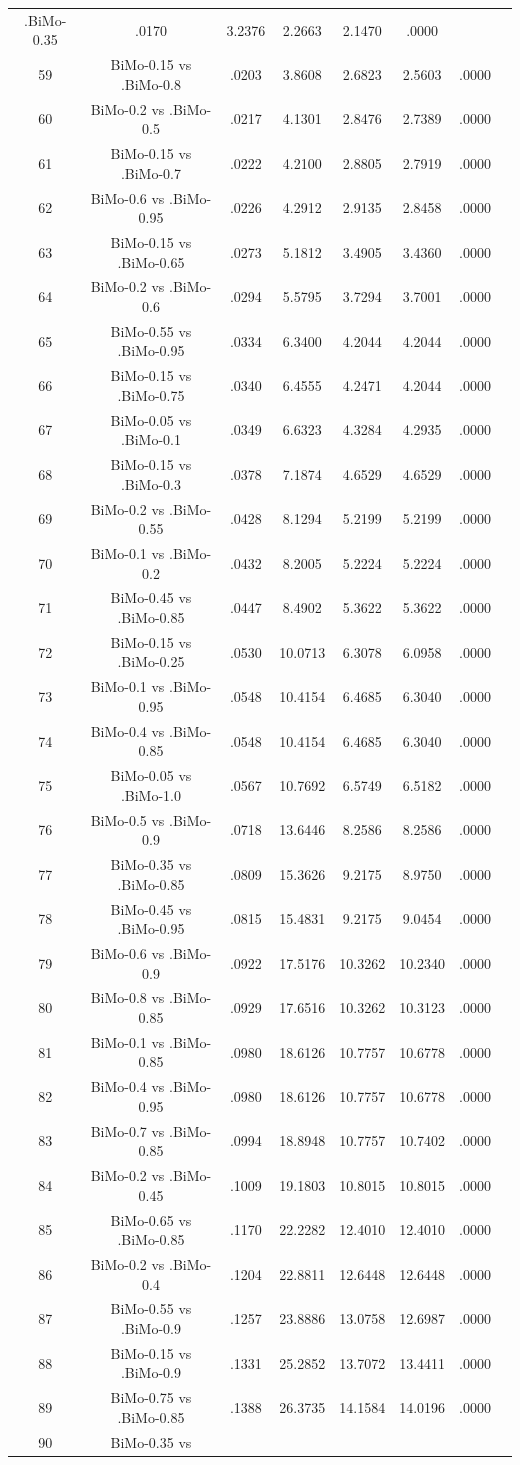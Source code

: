 \documentclass[a4paper,10pt]{article}
\begin{document}
\begin{landscape}
\begin{table}[!htp]
\begin{tabular}{cccccccc}
.BiMo-0.35&.0170&3.2376&2.2663&2.1470&.0000\\59&BiMo-0.15 vs .BiMo-0.8&.0203&3.8608&2.6823&2.5603&.0000\\60&BiMo-0.2 vs .BiMo-0.5&.0217&4.1301&2.8476&2.7389&.0000\\61&BiMo-0.15 vs .BiMo-0.7&.0222&4.2100&2.8805&2.7919&.0000\\62&BiMo-0.6 vs .BiMo-0.95&.0226&4.2912&2.9135&2.8458&.0000\\63&BiMo-0.15 vs .BiMo-0.65&.0273&5.1812&3.4905&3.4360&.0000\\64&BiMo-0.2 vs .BiMo-0.6&.0294&5.5795&3.7294&3.7001&.0000\\65&BiMo-0.55 vs .BiMo-0.95&.0334&6.3400&4.2044&4.2044&.0000\\66&BiMo-0.15 vs .BiMo-0.75&.0340&6.4555&4.2471&4.2044&.0000\\67&BiMo-0.05 vs .BiMo-0.1&.0349&6.6323&4.3284&4.2935&.0000\\68&BiMo-0.15 vs .BiMo-0.3&.0378&7.1874&4.6529&4.6529&.0000\\69&BiMo-0.2 vs .BiMo-0.55&.0428&8.1294&5.2199&5.2199&.0000\\70&BiMo-0.1 vs .BiMo-0.2&.0432&8.2005&5.2224&5.2224&.0000\\71&BiMo-0.45 vs .BiMo-0.85&.0447&8.4902&5.3622&5.3622&.0000\\72&BiMo-0.15 vs .BiMo-0.25&.0530&10.0713&6.3078&6.0958&.0000\\73&BiMo-0.1 vs .BiMo-0.95&.0548&10.4154&6.4685&6.3040&.0000\\74&BiMo-0.4 vs .BiMo-0.85&.0548&10.4154&6.4685&6.3040&.0000\\75&BiMo-0.05 vs .BiMo-1.0&.0567&10.7692&6.5749&6.5182&.0000\\76&BiMo-0.5 vs .BiMo-0.9&.0718&13.6446&8.2586&8.2586&.0000\\77&BiMo-0.35 vs .BiMo-0.85&.0809&15.3626&9.2175&8.9750&.0000\\78&BiMo-0.45 vs .BiMo-0.95&.0815&15.4831&9.2175&9.0454&.0000\\79&BiMo-0.6 vs .BiMo-0.9&.0922&17.5176&10.3262&10.2340&.0000\\80&BiMo-0.8 vs .BiMo-0.85&.0929&17.6516&10.3262&10.3123&.0000\\81&BiMo-0.1 vs .BiMo-0.85&.0980&18.6126&10.7757&10.6778&.0000\\82&BiMo-0.4 vs .BiMo-0.95&.0980&18.6126&10.7757&10.6778&.0000\\83&BiMo-0.7 vs .BiMo-0.85&.0994&18.8948&10.7757&10.7402&.0000\\84&BiMo-0.2 vs .BiMo-0.45&.1009&19.1803&10.8015&10.8015&.0000\\85&BiMo-0.65 vs .BiMo-0.85&.1170&22.2282&12.4010&12.4010&.0000\\86&BiMo-0.2 vs .BiMo-0.4&.1204&22.8811&12.6448&12.6448&.0000\\87&BiMo-0.55 vs .BiMo-0.9&.1257&23.8886&13.0758&12.6987&.0000\\88&BiMo-0.15 vs .BiMo-0.9&.1331&25.2852&13.7072&13.4411&.0000\\89&BiMo-0.75 vs .BiMo-0.85&.1388&26.3735&14.1584&14.0196&.0000\\90&BiMo-0.35 vs 
\end{tabular}
\end{table}
\end{landscape}
\end{document}
